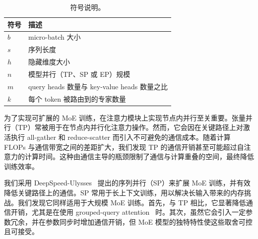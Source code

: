 

\begin{table}[t!]
    \centering
    \resizebox{0.8\linewidth}{!} {
        \begin{tabular}{@{}ll@{}}
            \toprule
            符号 & 描述 \\ \midrule
            $b$ & micro-batch 大小 \\
            $s$ & 序列长度 \\
            $h$ & 隐藏维度大小 \\
            $n$ & 模型并行（TP、SP 或 EP）规模 \\
            $m$ & query heads 数量与 key-value heads 数量之比 \\
            $k$ & 每个 token 被路由到的专家数量 \\
            \bottomrule
        \end{tabular}
    }
    \caption{符号说明。}
    \vspace{-0.25in}
    \label{tab:design:description}
\end{table}

为了实现可扩展的 MoE 训练，在注意力模块上实现节点内并行至关重要。张量并行（TP）常被用于在节点内并行化注意力操作。然而，它会因在关键路径上对激活执行 all-gather 和 reduce-scatter 而引入不可避免的通信成本。随着计算 FLOPs 与通信带宽之间的差距扩大，我们发现 TP 的通信开销甚至可能超过自注意力的计算时间。这种由通信主导的瓶颈限制了通信与计算重叠的空间，最终降低训练效率。

我们采用 DeepSpeed-Ulysses~\cite{jacobs2023deepspeed} 提出的序列并行（SP）来扩展 MoE 训练，并有效降低关键路径上的通信。SP 常用于长上下文训练，用以解决长输入带来的内存挑战。我们发现它同样适用于大规模 MoE 训练。首先，与 TP 相比，它显著降低通信开销，尤其是在使用 grouped-query attention~\cite{ainslie2023gqa} 时。其次，虽然它会引入一定参数冗余，并在参数同步时增加通信开销，但 MoE 模型的独特特性使这些取舍可控且可接受。

